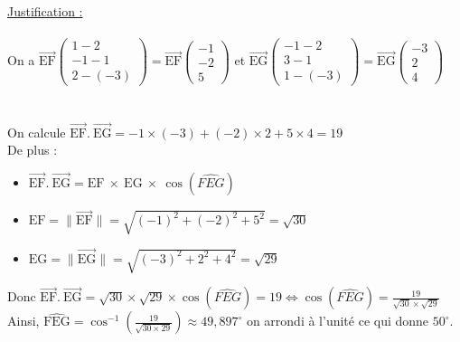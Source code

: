 \documentclass[a4paper, 12pt]{article}
\begin{document}
\noindent
\underline{Justification :}
\\ \\
On a $\overrightarrow{\text{EF}}\begin{pmatrix} 1-2 \\ -1-1 \\2-(-3)\end{pmatrix} = \overrightarrow{\text{EF}}\begin{pmatrix} -1 \\ -2 \\ 5 \end{pmatrix}$ 
et $\overrightarrow{\text{EG}}\begin{pmatrix} -1-2 \\ 3-1\\1-(-3)\end{pmatrix} = \overrightarrow{\text{EG}}\begin{pmatrix} -3 \\ 2 \\ 4 \end{pmatrix}$
\\ \\ \\
On calcule $\overrightarrow{\text{EF}} .\ \overrightarrow{\text{EG}} = -1 \times (-3) + (-2) \times 2 + 5 \times 4 = 19$
\\
De plus : \\
\begin{itemize}
    \item[\textbullet] $\overrightarrow{\text{EF}} .\ \overrightarrow{\text{EG}} = \text{EF}\ \times\ \text{EG}\ \times\ \cos{\left( \widehat{FEG} \right)}$ \\
    \item[\textbullet] $\text{EF} = \|\overrightarrow{\text{EF}}\| = \sqrt{(-1)^2 + (-2)^2 + 5^2} = \sqrt{30}$ \\ 
    \item[\textbullet] $\text{EG} = \| \overrightarrow{\text{EG}} \| = \sqrt{(-3)^2 + 2^2 + 4^2} = \sqrt{29}$ \\  
\end{itemize}
Donc $\overrightarrow{\text{EF}} .\ \overrightarrow{\text{EG}} = \sqrt{30}\times \sqrt{29} \times \cos{\left( \widehat{FEG} \right)} = 19 \iff \cos{\left( \widehat{FEG} \right)} = \frac{19}{\sqrt{30}\times \sqrt{29}}$
\\
Ainsi, $\widehat{\text{FEG}} = \cos^{-1}{ \left( \frac{19}{ \sqrt{30 \times 29}} \right) } \approx 49,897^{\circ}$ on arrondi à l'unité ce qui donne $50^{\circ}$.
\end{document}
